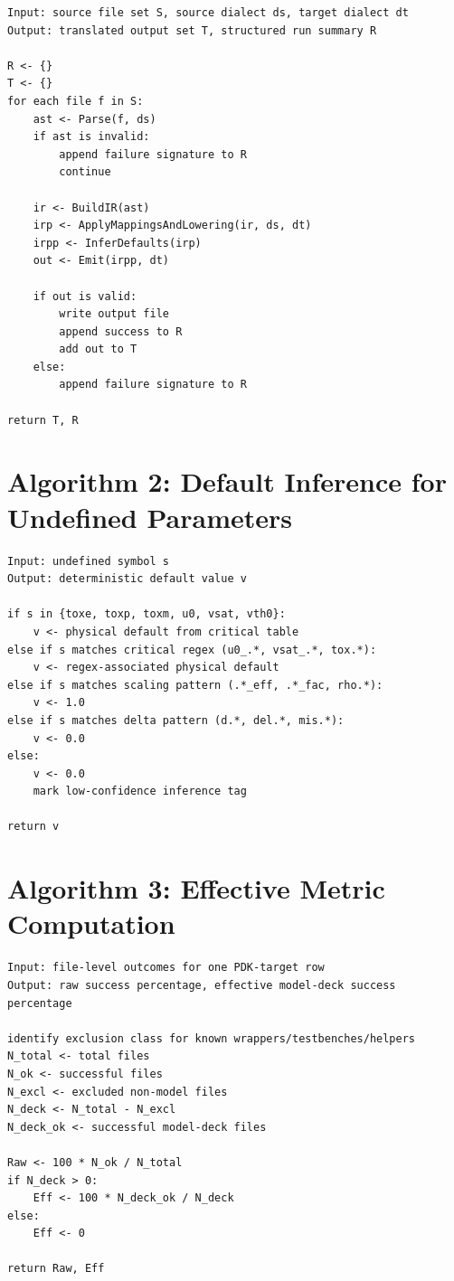 \documentclass[12pt,a4paper,oneside]{report}
\begin{document}
\begin{lstlisting}[style=pseudo,caption={End-to-End Semantic Translation},label={alg:main}]
Input: source file set S, source dialect ds, target dialect dt
Output: translated output set T, structured run summary R

R <- {}
T <- {}
for each file f in S:
    ast <- Parse(f, ds)
    if ast is invalid:
        append failure signature to R
        continue

    ir <- BuildIR(ast)
    irp <- ApplyMappingsAndLowering(ir, ds, dt)
    irpp <- InferDefaults(irp)
    out <- Emit(irpp, dt)

    if out is valid:
        write output file
        append success to R
        add out to T
    else:
        append failure signature to R

return T, R
\end{lstlisting}

\section{Algorithm 2: Default Inference for Undefined Parameters}

\begin{lstlisting}[style=pseudo,caption={Pattern-Based Parameter Default Inference},label={alg:defaults}]
Input: undefined symbol s
Output: deterministic default value v

if s in {toxe, toxp, toxm, u0, vsat, vth0}:
    v <- physical default from critical table
else if s matches critical regex (u0_.*, vsat_.*, tox.*):
    v <- regex-associated physical default
else if s matches scaling pattern (.*_eff, .*_fac, rho.*):
    v <- 1.0
else if s matches delta pattern (d.*, del.*, mis.*):
    v <- 0.0
else:
    v <- 0.0
    mark low-confidence inference tag

return v
\end{lstlisting}

\section{Algorithm 3: Effective Metric Computation}

\begin{lstlisting}[style=pseudo,caption={Effective Model-Deck Success Metric},label={alg:effective}]
Input: file-level outcomes for one PDK-target row
Output: raw success percentage, effective model-deck success percentage

identify exclusion class for known wrappers/testbenches/helpers
N_total <- total files
N_ok <- successful files
N_excl <- excluded non-model files
N_deck <- N_total - N_excl
N_deck_ok <- successful model-deck files

Raw <- 100 * N_ok / N_total
if N_deck > 0:
    Eff <- 100 * N_deck_ok / N_deck
else:
    Eff <- 0

return Raw, Eff
\end{lstlisting}
\end{document}
